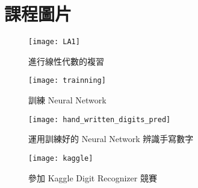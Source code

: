 \chapter*{課程圖片}
\begin{figure}[H]

    \centering

    \caption{進行線性代數的複習}

    \texttt{[image: LA1]}

\end{figure}

\begin{figure}[H]

    \centering

    \caption{訓練 Neural Network}

    \texttt{[image: trainning]}

\end{figure}

\begin{figure}[H]

    \centering

    \caption{運用訓練好的 Neural Network 辨識手寫數字}

    \texttt{[image: hand\_written\_digits\_pred]}

\end{figure}

\begin{figure}[H]

    \centering

    \caption{參加 Kaggle Digit Recognizer 競賽}

    \texttt{[image: kaggle]}

\end{figure}